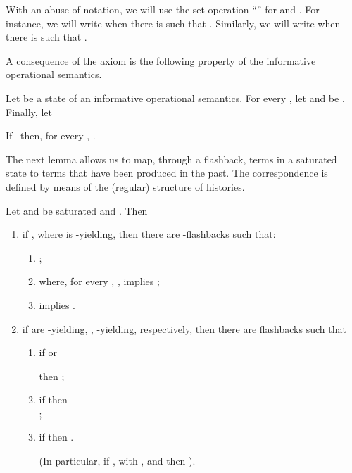 With an abuse of notation, we will use the set operation ``''
for  and . For instance, we will write   when there is
 such that . Similarly, we will write  when there
is  such that .

A consequence of the
axiom  is 
the following property of the informative operational semantics.

\begin{proposition}
\label{prop.storie-insieme}
Let 
be a state of an informative operational semantics. For every , let  and  be 
. 
Finally, let

\smallskip



\smallskip

If  \  
then, for every , 
.
\end{proposition}

The next lemma allows us to map, through a flashback, terms in a saturated 
state to terms that have been produced in the past. The correspondence is defined
by means of the (regular) structure of histories. 

\begin{lemma}
\label{lem.flashback}
Let  
and  
be saturated and 
. Then
\begin{enumerate}
\item
if , where 
 is -yielding, then there
are  -flashbacks  such that:
\begin{enumerate}
\item
;
\item
 where, 
for every , , implies 
;
\item
 
 implies 
.
\end{enumerate}

\item 
if  are  -yielding, , -yielding, respectively,
  then there are flashbacks  
such that
\begin{enumerate}
\item
if  or 
 
then ;
\item
if  
then \\
;

\item
if  then .

(In particular, if , with , and  then
).
\end{enumerate}
\end{enumerate}
\end{lemma}

